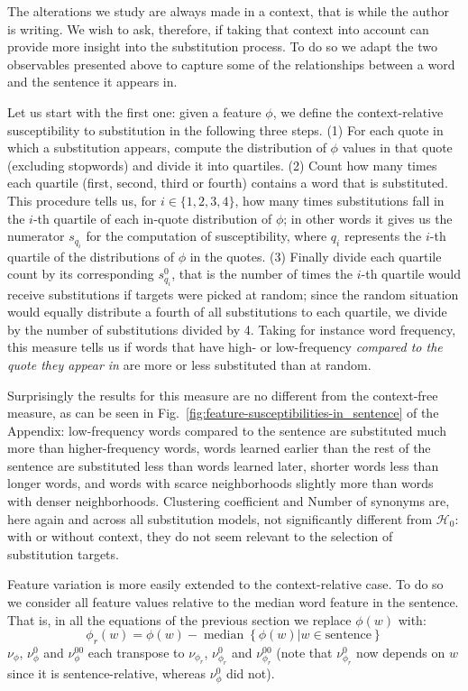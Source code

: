 \begin{new}

The alterations we study are always made in a context, that is while the author is writing.
We wish to ask, therefore, if taking that context into account can provide more insight into the substitution process.
To do so we adapt the two observables presented above to capture some of the relationships between a word and the sentence it appears in.

Let us start with the first one:
given a feature $\phi$, we define the context-relative susceptibility to substitution in the following three steps.
(1) For each quote in which a substitution appears, compute the distribution of $\phi$ values in that quote (excluding stopwords) and divide it into quartiles.
(2) Count how many times each quartile (first, second, third or fourth) contains a word that is substituted.
This procedure tells us, for $i \in \{1, 2, 3, 4\}$, how many times substitutions fall in the $i$-th quartile of each in-quote distribution of $\phi$;
in other words it gives us the numerator $s_{q_i}$ for the computation of susceptibility, where $q_i$ represents the $i$-th quartile of the distributions of $\phi$ in the quotes.
(3) Finally divide each quartile count by its corresponding $s_{q_i}^0$, that is the number of times the $i$-th quartile would receive substitutions if targets were picked at random;
since the random situation would equally distribute a fourth of all substitutions to each quartile, we divide by the number of substitutions divided by 4.
Taking for instance word frequency, this measure tells us if words that have high- or low-frequency \emph{compared to the quote they appear in} are more or less substituted than at random.

Surprisingly the results for this measure are no different from the context-free measure, as can be seen in Fig.~\ref{fig:feature-susceptibilities-in_sentence} of the Appendix:
low-frequency words compared to the sentence are substituted much more than higher-frequency words, words learned earlier than the rest of the sentence are substituted less than words learned later, shorter words less than longer words, and words with scarce neighborhoods slightly more than words with denser neighborhoods.
Clustering coefficient and Number of synonyms are, here again and across all substitution models, not significantly different from $\mathcal{H}_0$:
with or without context, they do not seem relevant to the selection of substitution targets.

Feature variation is more easily extended to the context-relative case.
To do so we consider all feature values relative to the median word feature in the sentence.
That is, in all the equations of the previous section we replace $\phi(w)$ with:
$$\phi_r(w) = \phi(w) - \operatorname{median}\left\lbrace \phi(w) | w \in \text{sentence} \right\rbrace$$
$\nu_{\phi}$, $\nu_{\phi}^0$ and $\nu_{\phi}^{00}$ each transpose to $\nu_{\phi_r}$, $\nu_{\phi_r}^0$ and $\nu_{\phi_r}^{00}$ (note that $\nu_{\phi_r}^0$ now depends on $w$ since it is sentence-relative, whereas $\nu_{\phi}^0$ did not).


\end{new}
